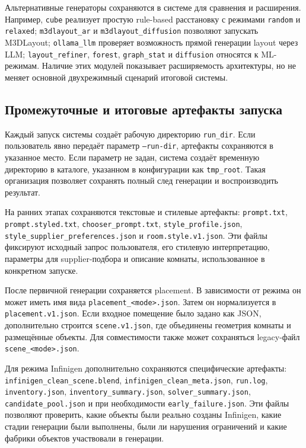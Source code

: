\documentclass[times]{itmo-student-thesis}
\begin{document}
Альтернативные генераторы сохраняются в системе для сравнения и расширения. Например, \texttt{cube} реализует простую rule-based расстановку с режимами \texttt{random} и \texttt{relaxed}; \texttt{m3dlayout\_ar} и \texttt{m3dlayout\_diffusion} позволяют запускать M3DLayout; \texttt{ollama\_llm} проверяет возможность прямой генерации layout через LLM; \texttt{layout\_refiner}, \texttt{forest}, \texttt{graph\_stat} и \texttt{diffusion} относятся к ML-режимам. Наличие этих модулей показывает расширяемость архитектуры, но не меняет основной двухрежимный сценарий итоговой системы.

\subsection{Промежуточные и итоговые артефакты запуска}

Каждый запуск системы создаёт рабочую директорию \texttt{run\_dir}. Если пользователь явно передаёт параметр \texttt{--run-dir}, артефакты сохраняются в указанное место. Если параметр не задан, система создаёт временную директорию в каталоге, указанном в конфигурации как \texttt{tmp\_root}. Такая организация позволяет сохранять полный след генерации и воспроизводить результат.

На ранних этапах сохраняются текстовые и стилевые артефакты: \texttt{prompt.txt}, \texttt{prompt.styled.txt}, \texttt{chooser\_prompt.txt}, \texttt{style\_profile.json}, \texttt{style\_supplier\_preferences.json} и \texttt{room.style.v1.json}. Эти файлы фиксируют исходный запрос пользователя, его стилевую интерпретацию, параметры для supplier-подбора и описание комнаты, использованное в конкретном запуске.

После первичной генерации сохраняется placement. В зависимости от режима он может иметь имя вида \texttt{placement\_<mode>.json}. Затем он нормализуется в \texttt{placement.v1.json}. Если входное помещение было задано как JSON, дополнительно строится \texttt{scene.v1.json}, где объединены геометрия комнаты и размещённые объекты. Для совместимости также может сохраняться legacy-файл \texttt{scene\_<mode>.json}.

Для режима Infinigen дополнительно сохраняются специфические артефакты: \texttt{infinigen\_clean\_scene.blend}, \texttt{infinigen\_clean\_meta.json}, \texttt{run.log}, \texttt{inventory.json}, \texttt{inventory\_summary.json}, \texttt{solver\_summary.json}, \texttt{candidate\_pool.json} и при необходимости \texttt{early\_failure.json}. Эти файлы позволяют проверить, какие объекты были реально созданы Infinigen, какие стадии генерации были выполнены, были ли нарушения ограничений и какие фабрики объектов участвовали в генерации.
\end{document}
